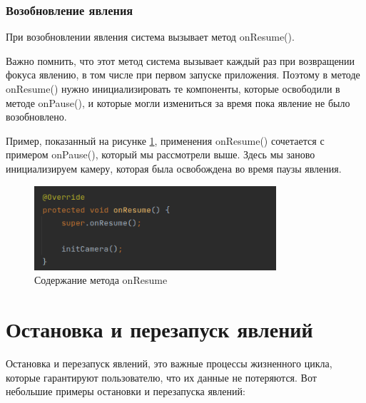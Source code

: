 \subsubsection{Возобновление явления}
При возобновлении явления система вызывает метод onResume().\par
Важно помнить, что этот метод система вызывает каждый раз при
возвращении фокуса явлению, в том числе при первом запуске приложения.
Поэтому в методе onResume() нужно инициализировать те компоненты,
которые освободили в методе onPause(), и которые могли измениться за
время пока явление не было возобновлено.\par
Пример, показанный на рисунке \ref{fig:activity:onResume:content}, применения
onResume() сочетается с примером onPause(), который мы рассмотрели выше.
Здесь мы заново инициализируем камеру, которая была освобождена во время
паузы явления.
\begin{figure}[h!tp]
	\centering
	\includegraphics[width=0.8\textwidth]{Screenshot from 2023-02-22 19-52-34.png}
	\caption{Содержание метода onResume}
	\label{fig:activity:onResume:content}
\end{figure}

\section{Остановка и перезапуск явлений}
Остановка и перезапуск явлений, это важные процессы жизненного цикла,
которые гарантируют пользователю, что их данные не потеряются. Вот
небольшие примеры остановки и перезапуска явлений:

